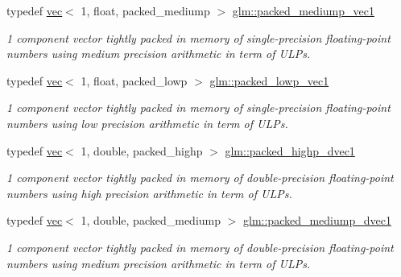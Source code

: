 \begin{DoxyCompactItemize}
\mbox{\label{group__gtc__type__aligned_gadf62fccc1514b0dca7ab1067263fca4c}} 
typedef \hyperlink{structglm_1_1vec}{vec}$<$ 1, float, packed\+\_\+mediump $>$ \hyperlink{group__gtc__type__aligned_gadf62fccc1514b0dca7ab1067263fca4c}{glm\+::packed\+\_\+mediump\+\_\+vec1}
\begin{DoxyCompactList}\small\item\em 1 component vector tightly packed in memory of single-\/precision floating-\/point numbers using medium precision arithmetic in term of U\+L\+Ps. \end{DoxyCompactList}\item 
\mbox{\label{group__gtc__type__aligned_ga23472ebc3f98baab2a17053bc3788a9c}} 
typedef \hyperlink{structglm_1_1vec}{vec}$<$ 1, float, packed\+\_\+lowp $>$ \hyperlink{group__gtc__type__aligned_ga23472ebc3f98baab2a17053bc3788a9c}{glm\+::packed\+\_\+lowp\+\_\+vec1}
\begin{DoxyCompactList}\small\item\em 1 component vector tightly packed in memory of single-\/precision floating-\/point numbers using low precision arithmetic in term of U\+L\+Ps. \end{DoxyCompactList}\item 
\mbox{\label{group__gtc__type__aligned_ga28333ae58dc1ce6fdf75a8dba0065603}} 
typedef \hyperlink{structglm_1_1vec}{vec}$<$ 1, double, packed\+\_\+highp $>$ \hyperlink{group__gtc__type__aligned_ga28333ae58dc1ce6fdf75a8dba0065603}{glm\+::packed\+\_\+highp\+\_\+dvec1}
\begin{DoxyCompactList}\small\item\em 1 component vector tightly packed in memory of double-\/precision floating-\/point numbers using high precision arithmetic in term of U\+L\+Ps. \end{DoxyCompactList}\item 
\mbox{\label{group__gtc__type__aligned_gaf34b2d86391c45507ccc7c605992b8d3}} 
typedef \hyperlink{structglm_1_1vec}{vec}$<$ 1, double, packed\+\_\+mediump $>$ \hyperlink{group__gtc__type__aligned_gaf34b2d86391c45507ccc7c605992b8d3}{glm\+::packed\+\_\+mediump\+\_\+dvec1}
\begin{DoxyCompactList}\small\item\em 1 component vector tightly packed in memory of double-\/precision floating-\/point numbers using medium precision arithmetic in term of U\+L\+Ps. \end{DoxyCompactList}\item 

\end{DoxyCompactItemize}

